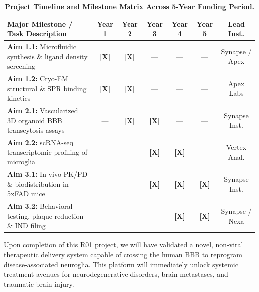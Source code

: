 \documentclass[11pt,letterpaper]{article}
\begin{document}
\begin{table}[h!]
\centering
\caption{\textbf{Project Timeline and Milestone Matrix Across 5-Year Funding Period.}}
\label{tab:timeline}
\small
{}
\begin{tabularx}{\textwidth}{@{}X c c c c c c@{}}
\toprule
\rowcolor{NIHBlue} \color{white}\textbf{Major Milestone / Task Description} & \color{white}\textbf{Year 1} & \color{white}\textbf{Year 2} & \color{white}\textbf{Year 3} & \color{white}\textbf{Year 4} & \color{white}\textbf{Year 5} & \color{white}\textbf{Lead Inst.} \\
\midrule
\textbf{Aim 1.1:} Microfluidic synthesis \& ligand density screening & \textbf{[X]} & \textbf{[X]} & {---} & {---} & {---} & Synapse / Apex \\
\textbf{Aim 1.2:} Cryo-EM structural \& SPR binding kinetics & \textbf{[X]} & \textbf{[X]} & {---} & {---} & {---} & Apex Labs \\
\textbf{Aim 2.1:} Vascularized 3D organoid BBB transcytosis assays & {---} & \textbf{[X]} & \textbf{[X]} & {---} & {---} & Synapse Inst. \\
\textbf{Aim 2.2:} scRNA-seq transcriptomic profiling of microglia & {---} & {---} & \textbf{[X]} & \textbf{[X]} & {---} & Vertex Anal. \\
\textbf{Aim 3.1:} In vivo PK/PD \& biodistribution in 5xFAD mice & {---} & {---} & \textbf{[X]} & \textbf{[X]} & \textbf{[X]} & Synapse Inst. \\
\textbf{Aim 3.2:} Behavioral testing, plaque reduction \& IND filing & {---} & {---} & {---} & \textbf{[X]} & \textbf{[X]} & Synapse / Nexa \\
\bottomrule
\end{tabularx}
\end{table}

\vspace{4pt}

\begin{innovationbox}
\small
Upon completion of this R01 project, we will have validated a novel, non-viral therapeutic delivery system capable of crossing the human BBB to reprogram disease-associated neuroglia. This platform will immediately unlock systemic treatment avenues for neurodegenerative disorders, brain metastases, and traumatic brain injury.
\end{innovationbox}
\end{document}
